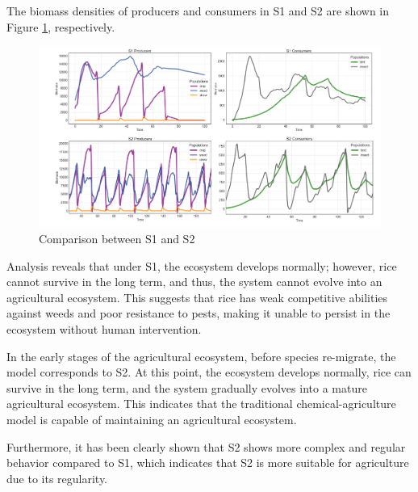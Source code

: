 \documentclass{HZNUMCM}
\begin{document}
      The biomass densities of producers and consumers in S1 and S2 are shown in Figure \ref{fig:S1S2}, respectively.

      \begin{figure}
      \centering
      \includegraphics[width=\linewidth]{images/S1S2.png}
      \caption{Comparison between S1 and S2}
      \label{fig:S1S2}
      \end{figure}
      
      Analysis reveals that under S1, the ecosystem develops normally; 
      however, rice cannot survive in the long term, and thus, the system cannot evolve into an agricultural ecosystem. 
      This suggests that rice has weak competitive abilities against weeds and poor resistance to pests, 
      making it unable to persist in the ecosystem without human intervention.
      
      In the early stages of the agricultural ecosystem, before species re-migrate, 
      the model corresponds to S2. At this point, the ecosystem develops normally, 
      rice can survive in the long term, and the system gradually evolves into a mature agricultural ecosystem. 
      This indicates that the traditional chemical-agriculture model is capable of maintaining an agricultural ecosystem. 
      
      Furthermore, it has been clearly shown that S2 shows more complex and regular behavior compared to S1, 
      which indicates that S2 is more suitable for agriculture due to its regularity.
      
\end{document}
